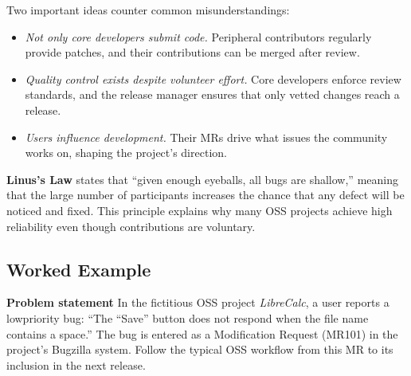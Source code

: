 \documentclass[12pt, a4paper]{article}
\begin{document}
Two important ideas counter common misunderstandings:

\begin{itemize}
  \item \textit{Not only core developers submit code.} Peripheral contributors regularly provide patches, and their contributions can be merged after review.
  \item \textit{Quality control exists despite volunteer effort.} Core developers enforce review standards, and the release manager ensures that only vetted changes reach a release.
  \item \textit{Users influence development.} Their MRs drive what issues the community works on, shaping the project's direction.
\end{itemize}

\textbf{Linus's Law} states that ``given enough eyeballs, all bugs are shallow,'' meaning that the large number of participants increases the chance that any defect will be noticed and fixed.  This principle explains why many OSS projects achieve high reliability even though contributions are voluntary.  

\subsection{Worked Example}
\textbf{Problem statement}  
In the fictitious OSS project \emph{LibreCalc}, a user reports a lowpriority bug: ``The ``Save'' button does not respond when the file name contains a space.''  The bug is entered as a Modification Request (MR101) in the project's Bugzilla system.  Follow the typical OSS workflow from this MR to its inclusion in the next release.
\end{document}
